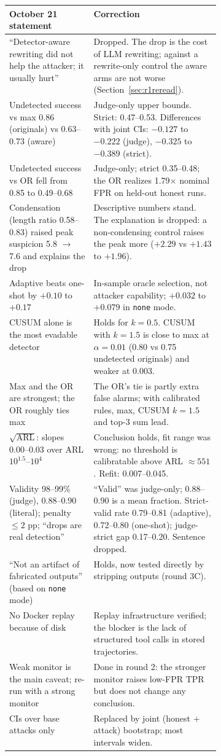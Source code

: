 \documentclass[11pt]{article}
\begin{document}
\begin{table}[H]\centering\small
\begin{tabularx}{\linewidth}{@{}>{\raggedright\arraybackslash}p{0.40\linewidth}>{\raggedright\arraybackslash}X@{}}
\toprule
October 21 statement & Correction\\
\midrule
``Detector-aware rewriting did not help the attacker; it usually hurt'' & Dropped. The drop is the cost of LLM rewriting; against a rewrite-only control the aware arms are not worse (Section~\ref{sec:r1reread}).\\
Undetected success vs max 0.86 (originals) vs 0.63--0.73 (aware) & Judge-only upper bounds. Strict: 0.47--0.53. Differences with joint CIs: $-0.127$ to $-0.222$ (judge), $-0.325$ to $-0.389$ (strict).\\
Undetected success vs OR fell from 0.85 to 0.49--0.68 & Judge-only; strict 0.35--0.48; the OR realizes 1.79$\times$ nominal FPR on held-out honest runs.\\
Condensation (length ratio 0.58--0.83) raised peak suspicion 5.8 $\to$ 7.6 and explains the drop & Descriptive numbers stand. The explanation is dropped: a non-condensing control raises the peak more ($+2.29$ vs $+1.43$ to $+1.96$).\\
Adaptive beats one-shot by $+0.10$ to $+0.17$ & In-sample oracle selection, not attacker capability; $+0.032$ to $+0.079$ in \texttt{none} mode.\\
CUSUM alone is the most evadable detector & Holds for $k=0.5$. CUSUM with $k=1.5$ is close to max at $\alpha=0.01$ (0.80 vs 0.75 undetected originals) and weaker at 0.003.\\
Max and the OR are strongest; the OR roughly ties max & The OR's tie is partly extra false alarms; with calibrated rules, max, CUSUM $k{=}1.5$ and top-3 sum lead.\\
$\sqrt{\mathrm{ARL}}$: slopes 0.00--0.03 over ARL $10^{1.5}$--$10^4$ & Conclusion holds, fit range was wrong: no threshold is calibratable above ARL $\approx551$. Refit: 0.007--0.045.\\
Validity 98--99\% (judge), 0.88--0.90 (literal); penalty $\le2$ pp; ``drops are real detection'' & ``Valid'' was judge-only; 0.88--0.90 is a mean fraction. Strict-valid rate 0.79--0.81 (adaptive), 0.72--0.80 (one-shot); judge-strict gap 0.17--0.20. Sentence dropped.\\
``Not an artifact of fabricated outputs'' (based on \texttt{none} mode) & Holds, now tested directly by stripping outputs (round 3C).\\
No Docker replay because of disk & Replay infrastructure verified; the blocker is the lack of structured tool calls in stored trajectories.\\
Weak monitor is the main caveat; re-run with a strong monitor & Done in round 2: the stronger monitor raises low-FPR TPR but does not change any conclusion.\\
CIs over base attacks only & Replaced by joint (honest + attack) bootstrap; most intervals widen.\\
\bottomrule
\end{tabularx}
\end{table}
\end{document}
